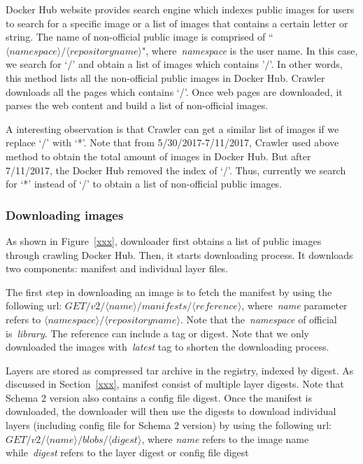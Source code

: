 Docker Hub website provides search engine which indexes public images for users to search for a specific image or a list of images that contains a certain letter or string. The name of non-official public image is comprised of ``$\langle namespace\rangle/\langle repository name \rangle$", where~\textit{namespace} is the user name. In this case, we search for `/' and obtain a list of images which contains '/'. In other words, this method lists all the non-official public images in Docker Hub. Crawler downloads all the pages which contains `/'. Once web pages are downloaded, it parses the web content and build a list of non-official images. 

A interesting observation is that Crawler can get a similar list of images if we replace `/' with `*'. Note that from 5/30/2017-7/11/2017, Crawler used above method to obtain the total amount of images in Docker Hub. But after 7/11/2017, the Docker Hub removed the index of `/'. Thus, currently we search for `*' instead of `/' to obtain a list of non-official public images.

\subsubsection{Downloading images}

As shown in Figure~\ref{xxx}, downloader first obtains a list of public images through crawling Docker Hub. Then, it starts downloading process. It downloads two components: manifest and individual layer files. 

The first step in downloading an image is to fetch the manifest by using the following url: $GET /v2/\langle name \rangle/manifests/\langle reference \rangle$, where~\textit{name} parameter refers to $\langle namespace\rangle/\langle repository name \rangle$. Note that the~\textit{namespace} of official is~\textit{library}. The reference can include a tag or digest. Note that we only downloaded the images with~\textit{latest} tag to shorten the downloading process. 

Layers are stored as compressed tar archive in the registry, indexed by digest. As discussed in Section~\ref{xxx}, manifest consist of multiple layer digests. Note that Schema 2 version also contains a config file digest. Once the manifest is downloaded, the downloader will then use the digests to download individual layers (including config file for Schema 2 version) by using the following url: $GET /v2/\langle name \rangle/blobs/\langle digest \rangle$, where \textit{name} refers to the image name while~\textit{digest} refers to the layer digest or config file digest 

